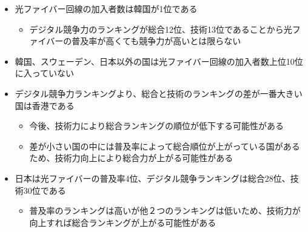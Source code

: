 \documentclass[a4paper,11pt,dvipdfmx]{ujarticle}
\begin{document}
\begin{itemize}
    \item 光ファイバー回線の加入者数は韓国が1位である
    \begin{itemize}
        \item デジタル競争力のランキングが総合12位、技術13位であることから光ファイバーの普及率が高くても競争力が高いとは限らない
    \end{itemize}
    \item 韓国、スウェーデン、日本以外の国は光ファイバー回線の加入者数上位10位に入っていない
    \item デジタル競争力ランキングより、総合と技術のランキングの差が一番大きい国は香港である
    \begin{itemize}
        \item 今後、技術力により総合ランキングの順位が低下する可能性がある
        \item 差が小さい国の中には普及率によって総合順位が上がっている国があるため、技術力向上により総合力が上がる可能性がある
    \end{itemize}
    \item 日本は光ファイバーの普及率4位、デジタル競争ランキングは総合28位、技術30位である
    \begin{itemize}
        \item 普及率のランキングは高いが他２つのランキングは低いため、技術力が向上すれば総合ランキングが上がる可能性がある
    \end{itemize}
\end{itemize}

%


\end{document}
